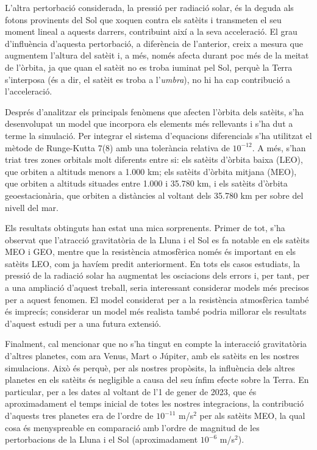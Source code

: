 \documentclass{article}
\begin{document}
L'altra pertorbació considerada, la pressió per radiació solar, és la deguda als fotons provinents del Sol que xoquen contra els satè\lgem its i transmeten el seu moment lineal a aquests darrers, contribuint així a la seva acceleració. El grau d'influència d'aquesta pertorbació, a diferència de l'anterior, creix a mesura que augmentem l'altura del satè\lgem it i, a més, només afecta durant poc més de la meitat de l'òrbita, ja que quan el satè\lgem it no es troba i\lgem uminat pel Sol, perquè la Terra s'interposa (és a dir, el satè\lgem it es troba a l'\emph{umbra}), no hi ha cap contribució a l'acceleració.

Després d'analitzar els principals fenòmens que afecten l'òrbita dels satè\lgem its, s'ha desenvolupat un model que incorpora els elements més rellevants i s'ha dut a terme la simulació. Per integrar el sistema d'equacions diferencials s'ha utilitzat el mètode de Runge-Kutta 7(8) amb una tolerància relativa de $10^{-12}$. A més, s'han triat tres zones orbitals molt diferents entre si: els satè\lgem its d'òrbita baixa (LEO), que orbiten a altituds menors a 1.000 km; els satè\lgem its d'òrbita mitjana (MEO), que orbiten a altituds situades entre 1.000 i 35.780 km, i els satè\lgem its d'òrbita geoestacionària, que orbiten a distàncies al voltant dels 35.780 km per sobre del nivell del mar.

Els resultats obtinguts han estat una mica sorprenents. Primer de tot, s'ha observat que l'atracció gravitatòria de la Lluna i el Sol es fa notable en els satè\lgem its MEO i GEO, mentre que la resistència atmosfèrica només és important en els satè\lgem its LEO, com ja havíem predit anteriorment. En tots els casos estudiats, la pressió de la radiació solar ha augmentat les osci\lgem acions dels errors i, per tant, per a una ampliació d'aquest treball, seria interessant considerar models més precisos per a aquest fenomen. El model considerat per a la resistència atmosfèrica també és imprecís; considerar un model més realista també podria millorar els resultats d'aquest estudi per a una futura extensió.

Finalment, cal mencionar que no s'ha tingut en compte la interacció gravitatòria d'altres planetes, com ara Venus, Mart o Júpiter, amb els satè\lgem its en les nostres simulacions. Això és perquè, per als nostres propòsits, la influència dels altres planetes en els satè\lgem its és negligible a causa del seu ínfim efecte sobre la Terra. En particular, per a les dates al voltant de l'1 de gener de 2023, que és aproximadament el temps inicial de totes les nostres integracions, la contribució d'aquests tres planetes era de l'ordre de $10^{-11}$ m/s$^2$ per als satè\lgem its MEO, la qual cosa és menyspreable en comparació amb l'ordre de magnitud de les pertorbacions de la Lluna i el Sol (aproximadament $10^{-6}$ m/s$^2$).
\end{document}
